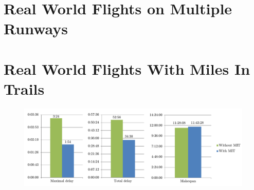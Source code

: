 \section{Real World Flights on Multiple Runways}




\section{Real World Flights With Miles In Trails}

\begin{figure}[h]
    \centering
    \includegraphics[width=\textwidth]{graphs/mit.pdf}
    \caption{}
    \label{graph:mit}
\end{figure}